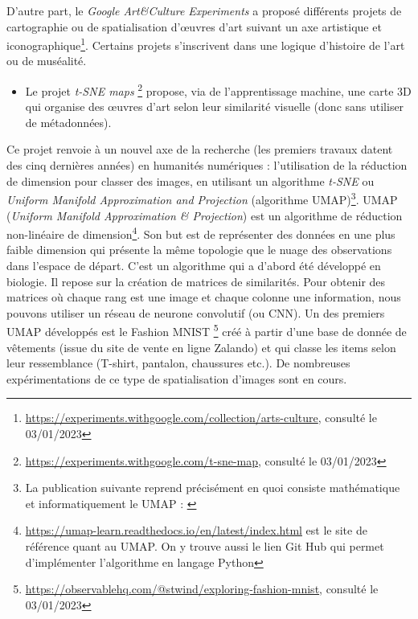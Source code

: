 \documentclass[a4paper, twoside, 12pt]{book}
\begin{document}
D'autre part, le \textit{Google Art\&Culture Experiments} a proposé différents projets de cartographie ou de spatialisation d'\oe{}uvres d'art suivant un axe artistique et iconographique\footnote{\url{https://experiments.withgoogle.com/collection/arts-culture}, consulté le 03/01/2023}. Certains projets s'inscrivent dans une logique d'histoire de l'art ou de muséalité.
\begin{itemize}
    \item Le projet \textit{t-SNE maps} \footnote{\url{https://experiments.withgoogle.com/t-sne-map}, consulté le 03/01/2023} propose, via de l'apprentissage machine, une carte 3D qui organise des \oe{}uvres d'art selon leur similarité visuelle (donc sans utiliser de métadonnées).
\end{itemize}

\noindent Ce projet renvoie à un nouvel axe de la recherche (les premiers travaux datent des cinq dernières années) en humanités numériques : l'utilisation de la réduction de dimension pour classer des images, en utilisant un algorithme \textit{t-SNE} ou \textit{Uniform Manifold Approximation and Projection} (algorithme UMAP)\footnote{La publication suivante reprend précisément en quoi consiste mathématique et informatiquement le UMAP : \cite{mcinnesUMAPUniformManifold2018}}. UMAP (\textit{Uniform Manifold Approximation \& Projection}) est un algorithme de réduction non-linéaire de dimension\footnote{\url{https://umap-learn.readthedocs.io/en/latest/index.html} est le site de référence quant au UMAP. On y trouve aussi le lien Git Hub qui permet d'implémenter l'algorithme en langage Python}. Son but est de représenter des données en une plus faible dimension qui présente la même topologie que le nuage des observations dans l'espace de départ. C'est un algorithme qui a d'abord été développé en biologie. Il repose sur la création de matrices de similarités. Pour obtenir des matrices où chaque rang est une image et chaque colonne une information, nous pouvons utiliser un réseau de neurone convolutif (ou CNN). Un des premiers UMAP développés est le Fashion MNIST \footnote{\url{https://observablehq.com/@stwind/exploring-fashion-mnist}, consulté le 03/01/2023}  créé à partir d'une base de donnée de vêtements (issue du site de vente en ligne Zalando) et qui classe les items selon leur ressemblance (T-shirt, pantalon, chaussures etc.). De nombreuses expérimentations de ce type de spatialisation d'images sont en cours. 
\end{document}
